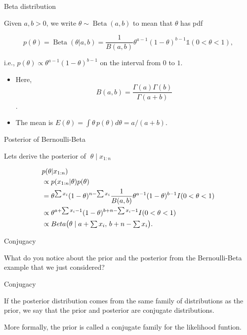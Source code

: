 \documentclass[
  ignorenonframetext,
]{beamer}
\providecommand{\tightlist}{%
  \setlength{\itemsep}{0pt}\setlength{\parskip}{0pt}}
\DeclareMathOperator*{\Beta}{Beta}
\newcommand{\I}{\mathds{1}}
\begin{document}
\begin{frame}{Beta distribution}
\protect\hypertarget{beta-distribution}{}

Given \(a,b>0\), we write \(\theta \sim \Beta(a,b)\) to mean that
\(\theta\) has pdf

\[
p(\theta) =\Beta(\theta|a,b) =\frac{1}{B(a,b)}\theta^{a-1}(1-\theta)^{b-1}\I(0<\theta<1),
\]

i.e., \(p(\theta)\propto \theta^{a-1}(1-\theta)^{b-1}\) on the interval
from \(0\) to \(1\).

\begin{itemize}
\tightlist
\item
  Here, \[B(a,b) = \frac{\Gamma(a)\Gamma(b)}{\Gamma(a+b)}\].
\item
  The mean is \(E(\theta) =\int \theta\,p(\theta)d\theta = a/(a+b)\).
\end{itemize}

\end{frame}

\begin{frame}{Posterior of Bernoulli-Beta}
\protect\hypertarget{posterior-of-bernoulli-beta}{}

Lets derive the posterior of \(\; \theta \mid x_{1:n}\)

\[\begin{aligned}
&p(\theta|x_{1:n})  \\
&\propto p(x_{1:n}|\theta) p(\theta)\notag\\
& =\theta^{\sum x_i}(1-\theta)^{n-\sum x_i}\frac{1}{B(a,b)}\theta^{a-1}(1-\theta)^{b-1}I(0<\theta<1) \notag\\
& \propto \theta^{a +\sum x_i - 1}(1-\theta)^{b +n-\sum x_i - 1}I(0<\theta<1)\notag\\
& \propto \textstyle Beta\big(\theta\mid a +\sum x_i, \, b + n-\sum x_i\big).
\label{equation:Beta-Bernoulli-posterior}
\end{aligned}
\]

\end{frame}

\begin{frame}{Conjugacy}
\protect\hypertarget{conjugacy}{}

What do you notice about the prior and the posterior from the
Bernoulli-Beta example that we just considered?

\end{frame}

\begin{frame}{Conjugacy}
\protect\hypertarget{conjugacy-1}{}

If the posterior distribution comes from the same family of
distributions as the prior, we say that the prior and posterior are
conjugate distributions.

More formally, the prior is called a conjugate family for the likelihood
funtion.

\end{frame}
\end{document}
